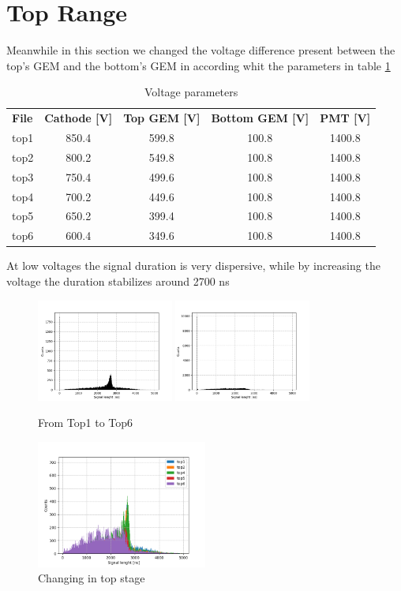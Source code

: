 \documentclass[a4paper,twoside,openany]{book}
\begin{document}
	\section{Top Range}
Meanwhile in this section we changed the voltage difference present between the top's GEM and the bottom's GEM in according whit the parameters in table \ref{toprange}
\begin{table}[H]
\centering
\begin{tabular}{l|c|c|c|c}\hline
\textbf{File}&\textbf{Cathode [V]}&\textbf{Top GEM [V]}&\textbf{Bottom GEM [V]}&\textbf{PMT [V]}\\
top1&850.4&599.8&100.8&1400.8\\\hline
top2&800.2&549.8&100.8&1400.8\\\hline
top3&750.4&499.6&100.8&1400.8\\\hline
top4&700.2&449.6&100.8&1400.8\\\hline
top5&650.2&399.4&100.8&1400.8\\\hline
top6&600.4&349.6&100.8&1400.8\\\hline
\end{tabular}
\caption{Voltage parameters}
\label{toprange}
\end{table}

At low voltages the signal duration is very dispersive, while by increasing the voltage the duration stabilizes around 2700 ns

\begin{figure}[H]
\centering
\includegraphics[width=0.4\textwidth, height=0.3\textwidth]{Histo_top1}
\includegraphics[width=0.4\textwidth, height=0.3\textwidth]{Histo_top6}
\caption{From Top1 to Top6}
\end{figure}

\begin{figure}[H]
\centering
\includegraphics[width=0.5\textwidth, height=0.4\textwidth]{Histo_top}
\caption{Changing in top stage}
\end{figure}
\end{document}

